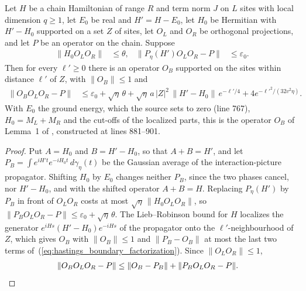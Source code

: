 \begin{lemma}
    \label{thm:hastings_boundary_factorization}
    \leanok
    Let $H$ be a chain Hamiltonian of range $R$ and term norm $J$ on $L$ sites
    with local dimension $q\ge1$, let $E_0$ be real and $H'=H-E_0$, let $H_0$
    be Hermitian with $H'-H_0$ supported on a set $Z$ of sites, let $O_L$ and
    $O_R$ be orthogonal projections, and let $P$ be an operator on the chain.
    Suppose
    \begin{align}
        \|H_0O_LO_R\|          & \le\theta,        &
        \|P_\eta(H')O_LO_R-P\| & \le\varepsilon_0.
        \label{eq:hastings_boundary_factorization_hyp}
    \end{align}
    Then for every $\ell'\ge0$ there is an operator $O_B$ supported on the
    sites within distance $\ell'$ of $Z$, with $\|O_B\|\le1$ and
    \begin{align}
        \|O_BO_LO_R-P\|
         & \le\varepsilon_0+\sqrt\eta\,\theta
        +\sqrt\eta\,a\,|Z|^2\,\|H'-H_0\|\,e^{-\ell'/4}
        +4e^{-\ell'^2/(32v^2\eta)}.
        \label{eq:hastings_boundary_factorization}
    \end{align}
    With $E_0$ the ground energy, which the source sets to zero (line 767),
    $H_0=M_L+M_R$ and the cut-offs of the localized parts, this is the
    operator $O_B$ of Lemma~1 of \cite{Hastings2007AreaLaw}, constructed at
    lines 881--901.
\end{lemma}
\begin{proof}\leanok
    Put $A=H_0$ and $B=H'-H_0$, so that $A+B=H'$, and let
    $P_B=\int e^{iH't}e^{-iH_0t}\,d\gamma_\eta(t)$ be the Gaussian average of
    the interaction-picture propagator. Shifting $H_0$ by $E_0$ changes neither
    $P_B$, since the two phases cancel, nor $H'-H_0$, and with the shifted
    operator $A+B=H$. Replacing $P_\eta(H')$ by $P_B$ in front
    of $O_LO_R$ costs at most $\sqrt\eta\,\|H_0O_LO_R\|$, so
    $\|P_BO_LO_R-P\|\le\varepsilon_0+\sqrt\eta\,\theta$. The Lieb--Robinson
    bound for $H$ localizes the generator $e^{iHs}(H'-H_0)e^{-iHs}$ of the propagator
    onto the $\ell'$-neighbourhood of $Z$, which gives $O_B$ with $\|O_B\|\le1$
    and $\|P_B-O_B\|$ at most the last two terms
    of~(\ref{eq:hastings_boundary_factorization}). Since
    $\|O_LO_R\|\le1$,
    \begin{align}
        \|O_BO_LO_R-P\| & \le\|O_B-P_B\|+\|P_BO_LO_R-P\|.
        \notag
    \end{align}
\end{proof}
